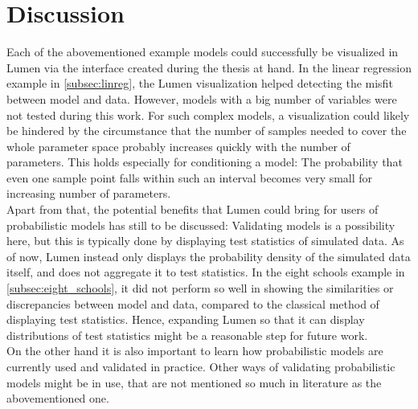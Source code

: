 \documentclass{article}
\begin{document}
 \section{Discussion}
Each of the abovementioned example models could successfully be visualized in Lumen via the interface created during the thesis at hand. In the linear regression example in \autoref{subsec:linreg}, the Lumen visualization helped detecting the misfit between model and data. However, models with a big number of variables were not tested during this work. For such complex models, a visualization could likely be hindered by the circumstance that the number of samples needed to cover the whole parameter space probably increases quickly with the number of parameters. This holds especially for conditioning a model: The probability that even one sample point falls within such an interval becomes very small for increasing number of parameters. 
\\
Apart from that, the potential benefits that Lumen could bring for users of probabilistic models has still to be discussed: Validating models is a possibility here, but this is typically done by displaying test statistics of simulated data. As of now, Lumen instead only displays the probability density of the simulated data itself, and does not aggregate it to test statistics. In the eight schools example in \autoref{subsec:eight_schools}, it did not perform so well in showing the similarities or discrepancies between model and data, compared to the classical method of displaying test statistics. Hence, expanding Lumen so that it can display distributions of test statistics might be a reasonable step for future work.
\\
On the other hand it is also important to learn how probabilistic models are currently used and validated in practice. Other ways of validating probabilistic models might be in use, that are not mentioned so much in literature as the abovementioned one.
\end{document}

